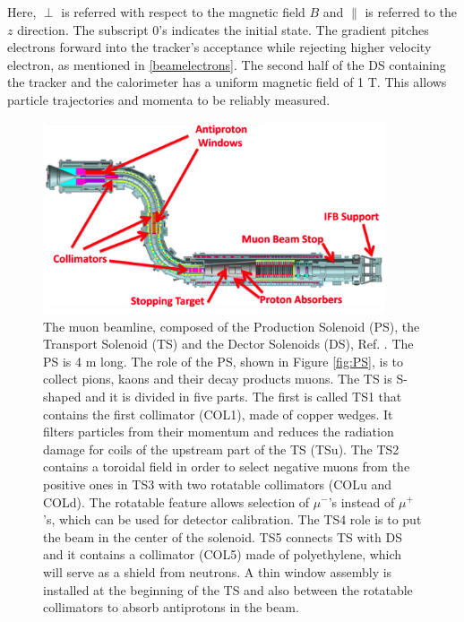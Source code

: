 Here, $\perp$ is referred with respect to the magnetic field $B$ and $\parallel$ is referred to the $z$ direction. The subscript 0’s indicates the initial state. The gradient pitches electrons forward into the tracker's acceptance while rejecting higher velocity electron, as mentioned in \ref{beamelectrons}. 
The second half of the DS containing the tracker and the calorimeter has a uniform magnetic field of 1 T. This allows particle trajectories and momenta to be reliably measured.
\begin{figure}[!h]
\centering
\includegraphics[width =0.9\textwidth]{figures/png/Screenshot_20240303_152845.png}
\caption{The muon beamline, composed of the Production Solenoid (PS), the Transport Solenoid (TS) and the Dector Solenoids (DS), Ref. \cite{ginther}. The PS is 4 m long. The role of the PS, shown in Figure \ref{fig:PS}, is to collect pions, kaons and their decay products muons. The TS is S-shaped and it is divided in five parts. The first is called TS1 that contains the first collimator (COL1), made of copper wedges. It filters particles from their momentum and reduces the radiation damage for coils of the upstream part of the TS (TSu). The TS2 contains a toroidal field in order to select negative muons from the positive ones in TS3 with two rotatable collimators (COLu and COLd). The rotatable feature allows selection of $\mu^-$'s instead of $\mu^+$'s, which can be used for detector calibration. The TS4 role is to put the beam in the center of the solenoid. TS5 connects TS with DS and it contains a collimator (COL5) made of polyethylene, which will serve as a shield from neutrons. A thin window assembly is installed at the beginning of the TS and also between the rotatable collimators to absorb antiprotons in the beam.
}
\end{figure}
